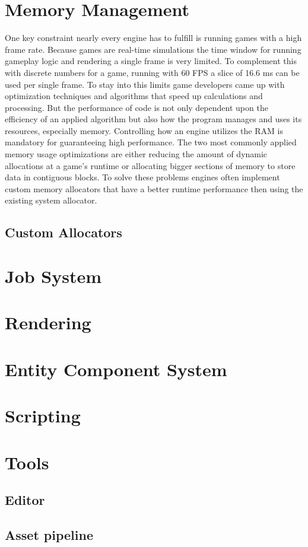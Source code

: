 \section{Memory Management}

One key constraint nearly every engine has to fulfill is running games with a high frame rate. Because games are real-time simulations the time window for running gameplay logic and rendering a single frame is very limited. To complement this with discrete numbers for a game, running with 60 \ac{FPS} a slice of 16.6 ms can be used per single frame. To stay into this limits game developers came up with optimization techniques and algorithms that speed up calculations and processing. But the performance of code is not only dependent upon the efficiency of an applied algorithm but also how the program manages and uses its resources, especially memory. Controlling how an engine utilizes the \ac{RAM} is mandatory for guaranteeing high performance. The two most commonly applied memory usage optimizations are either reducing the amount of dynamic allocations at a game's runtime or allocating bigger sections of memory to store data in contiguous blocks. To solve these problems engines often implement custom memory allocators that have a better runtime performance then using the existing system allocator.

\subsection{Custom Allocators}
\blindtext

\section{Job System}
\blindtext
\section{Rendering}
\blindtext
\section{Entity Component System}
\blindtext
\section{Scripting}
\blindtext
\section{Tools}
\blindtext
\subsection{Editor}
\blindtext
\subsection{Asset pipeline}
\blindtext